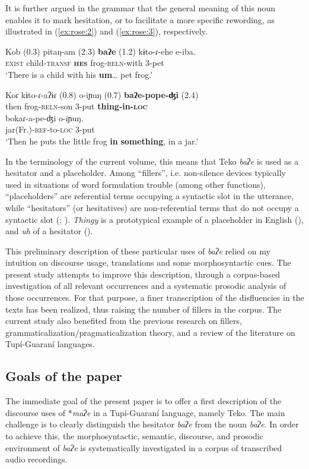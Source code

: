 \documentclass[output=paper]{langscibook}
\begin{document}
It is further argued in the grammar that the general meaning of this noun enables it to mark hesitation, or to facilitate a more specific rewording, as illustrated in (\ref{ex:rose:2}) and (\ref{ex:rose:3}), respectively. 

\ea \label{ex:rose:2}
\gll Kob (0.3)  pitaŋ-am (2.3)  \textbf{baʔe} (1.2) kɨto-ɾ{}-ehe  e-iba.\\
\textsc{exist} {} child-\textsc{transf} {} \textbf{\textsc{hes}} {} frog-\textsc{reln}{}-with  3-pet\\
\glt ‘There is a child with his \textbf{um}… pet frog.’ 
\z 

\ea \label{ex:rose:3}
\gll Koɾ  kɨto-ɾ{}-aʔɨɾ (0.8) o-iɲuŋ (0.7)  \textbf{baʔe-pope-ʤi} (2.4)\\
then  frog-\textsc{reln}{}-son {} 3-put {}   \textbf{thing-in-\textsc{loc}} {} \\
\gll bokaɾ-a-pe-ʤi  o-iɲuŋ.\\
jar(Fr.)-\textsc{ref}{}-to-\textsc{loc}  3-put\\
\glt ‘Then he puts the little frog \textbf{in} \textbf{something}, in a jar.’ 
\z

In the terminology of the current volume, this means that Teko \textit{baʔe} is used as a hesitator and a placeholder. Among “fillers”, i.e. non-silence devices typically used in situations of word formulation trouble (among other functions), “placeholders” are referential terms occupying a syntactic slot in the utterance, while “hesitators” (or hesitatives) are non-referential terms that do not occupy a syntactic slot (\citealt{Podlesskaya2010}; \citealt{HayashiYoon2006}). \textit{Thingy} is a prototypical example of a placeholder in English (\citealt{Pertejo2015}), and \textit{uh} of a hesitator (\citealt{Tree2002}).

This preliminary description of these particular uses of \textit{baʔe} relied on my intuition on discourse usage, translations and some morphosyntactic cues. The present study attempts to improve this description, through a corpus-based investigation of all relevant occurrences and a systematic prosodic analysis of those occurrences. For that purpose, a finer transcription of the disfluencies in the texts has been realized, thus raising the number of fillers in the corpus. The current study also benefited from the previous research on fillers, grammaticalization/pragmaticalization theory, and a review of the literature on Tupí-Guaraní languages.

\subsection{Goals of the paper}
\label{sec:rose:1.3}
The immediate goal of the present paper is to offer a first description of the discourse uses of *\textit{maʔe} in a Tupí-Guaraní language, namely Teko. The main challenge is to clearly distinguish the hesitator \textit{baʔe} from the noun \textit{baʔe}. In order to achieve this, the morphosyntactic, semantic, discourse, and prosodic environment of \textit{baʔe} is systematically investigated in a corpus of transcribed audio recordings.
\end{document}
